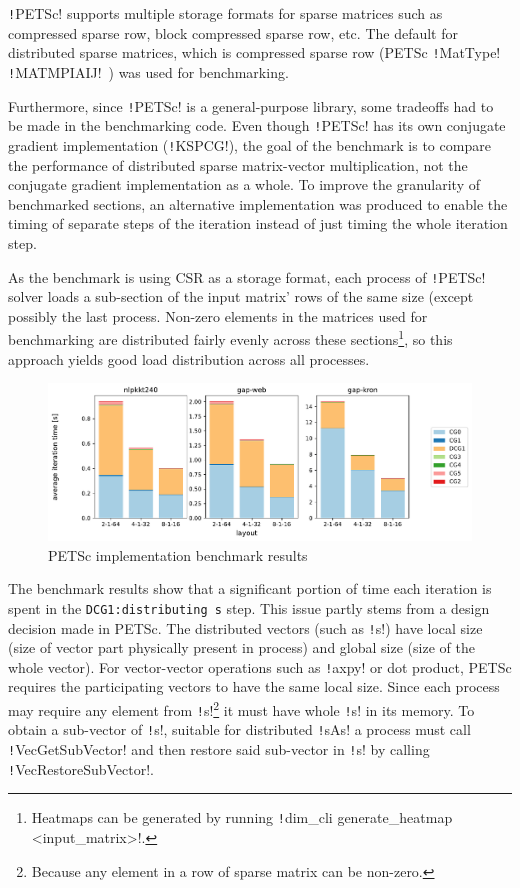 \documentclass[thesis=M,english]{FITthesis}[2019/12/23]
\newcommand{\csre}[1]{\texttt!#1!}
\begin{document}
\csre{PETSc} supports
multiple storage formats for sparse matrices such as compressed sparse row, block compressed
sparse row, etc. The default for distributed sparse matrices, which is compressed sparse row
(PETSc \csre{MatType} \csre{MATMPIAIJ}~\cite{petsc-user-ref}) was used for benchmarking.

Furthermore, since \csre{PETSc} is a general-purpose library, some tradeoffs had to be made
in the benchmarking code. Even though \csre{PETSc} has its own conjugate gradient implementation
(\csre{KSPCG}),
the goal of the benchmark is to compare the performance of distributed sparse matrix-vector
multiplication, not the conjugate gradient implementation as a whole. To improve the granularity
of benchmarked sections, an alternative
implementation was produced to enable the timing of separate steps of the iteration instead of just
timing the whole iteration step.

As the benchmark is using CSR as a storage format,
each process of \csre{PETSc} solver loads a sub-section of the input matrix' rows of the same size (except possibly the last
process. Non-zero elements in the matrices used for benchmarking are distributed fairly
evenly across these sections\footnote{Heatmaps can be generated by running  \csre{dim_cli generate_heatmap <input_matrix>}.},
so this approach yields good load distribution across all processes.

\begin{figure}[htp]
    \centering
    \includegraphics[scale=0.5]{static/petsc_mpi.pdf}
    \caption{PETSc implementation benchmark results}
\end{figure}

The benchmark results show that a significant portion of time each iteration is spent in the \texttt{DCG1:distributing s}
step. This issue partly stems from a design decision made in PETSc. The distributed vectors (such as \csre{s})
have local size (size of vector part physically present in process) and global size (size of the whole vector).
For vector-vector operations such as \csre{axpy} or dot product, PETSc requires the participating vectors to
have the same local size. Since each process may require any element from
\csre{s}\footnote{Because any element in a row of sparse matrix can be non-zero.} it must have whole \csre{s}
in its memory. To obtain a sub-vector of \csre{s}, suitable for distributed \csre{sAs} a process must call
\csre{VecGetSubVector} and then restore said sub-vector in \csre{s} by calling \csre{VecRestoreSubVector}.
\end{document}
